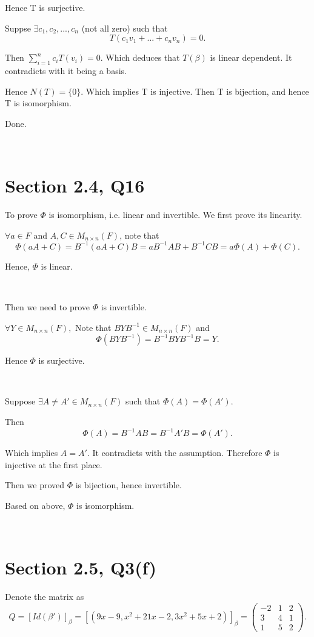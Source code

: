 \documentclass[12pt]{article}%
\begin{document}
Hence T is surjective. 

Suppse $\exists c_1,c_2,...,c_n$ (not all zero) such that $$T(c_1v_1+...+c_nv_n)=0.$$ 

Then $\sum_{i=1}^{n}c_iT(v_i)=0.$ Which deduces that $T(\beta)$ is linear dependent. It contradicts with it being a basis.

Hence $N(T)=\{0\}.$ Which implies T is injective. Then T is bijection, and hence T is isomorphism.

Done.

~\ 

\section{Section 2.4, Q16}

To prove $\Phi$ is isomorphism, i.e. linear and invertible. We first prove its linearity. 

$\forall a\in F$ and $ A,C \in M_{n \times n}(F)$, note that $$\Phi(aA+C)=B^{-1}(aA+C)B=aB^{-1}AB+B^{-1}CB=a\Phi(A)+\Phi(C).$$

Hence, $\Phi$ is linear.

~\ 

Then we need to prove $\Phi$ is invertible.

$\forall Y \in M_{n \times n}(F),$ Note that $BYB^{-1} \in M_{n \times n}(F)$ and $$\Phi(BYB^{-1})=B^{-1}BYB^{-1}B=Y.$$ 

Hence $\Phi$ is surjective. 

~\ 

Suppose $\exists A\neq A' \in M_{n \times n}(F)$ such that $\Phi(A)=\Phi(A').$ 

Then $$\Phi(A)=B^{-1}AB=B^{-1}A'B=\Phi(A').$$ 

Which implies $A=A'.$ It contradicts with the assumption. Therefore $\Phi$ is injective at the first place. 

Then we proved $\Phi$ is bijection, hence invertible. 

Based on above, $\Phi$ is isomorphism.

~\ 

\section{Section 2.5, Q3(f)}

Denote the matrix as $$Q=[Id(\beta')]_\beta=[(9x-9,x^2+21x-2,3x^2+5x+2)]_\beta=\begin{pmatrix}-2&1&2\\3&4&1\\1&5&2\end{pmatrix}.$$
\end{document}
